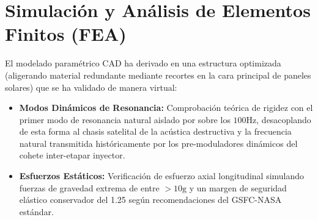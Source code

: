 \section{Simulación y Análisis de Elementos Finitos (FEA)}
El modelado paramétrico CAD ha derivado en una estructura optimizada (aligerando material redundante mediante recortes en la cara principal de paneles solares) que se ha validado de manera virtual:
\begin{itemize}
    \item \textbf{Modos Dinámicos de Resonancia:} Comprobación teórica de rigidez con el primer modo de resonancia natural aislado por sobre los $100\text{Hz}$, desacoplando de esta forma al chasis satelital de la acústica destructiva y la frecuencia natural transmitida históricamente por los pre-moduladores dinámicos del cohete inter-etapar inyector.
    \item \textbf{Esfuerzos Estáticos:} Verificación de esfuerzo axial longitudinal simulando fuerzas de gravedad extrema de entre $>10\text{g}$ y un margen de seguridad elástico conservador del 1.25 según recomendaciones del GSFC-NASA estándar.
\end{itemize}
